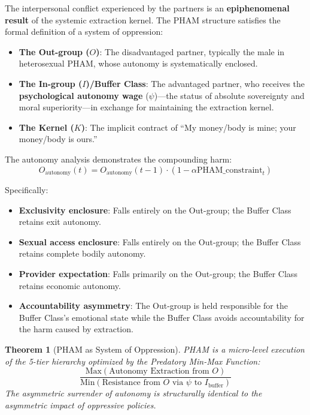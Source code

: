 \documentclass[12pt,openany]{book}
\newtheorem{theorem}{Theorem}[chapter]
\numberwithin{equation}{chapter}
\begin{document}
The interpersonal conflict experienced by the partners is an \textbf{epiphenomenal result} of the systemic extraction kernel. The PHAM structure satisfies the formal definition of a system of oppression:

\begin{itemize}
    \item \textbf{The Out-group ($O$)}: The disadvantaged partner, typically the male in heterosexual PHAM, whose autonomy is systematically enclosed.
    \item \textbf{The In-group ($I$)/Buffer Class}: The advantaged partner, who receives the \textbf{psychological autonomy wage} ($\psi$)---the status of absolute sovereignty and moral superiority---in exchange for maintaining the extraction kernel.
    \item \textbf{The Kernel ($K$)}: The implicit contract of ``My money/body is mine; your money/body is ours.''
\end{itemize}

The autonomy analysis demonstrates the compounding harm:
\[
O_{\text{autonomy}}(t) = O_{\text{autonomy}}(t-1) \cdot (1 - \alpha \text{PHAM\_constraint}_t)
\]

Specifically:
\begin{itemize}
    \item \textbf{Exclusivity enclosure}: Falls entirely on the Out-group; the Buffer Class retains exit autonomy.
    \item \textbf{Sexual access enclosure}: Falls entirely on the Out-group; the Buffer Class retains complete bodily autonomy.
    \item \textbf{Provider expectation}: Falls primarily on the Out-group; the Buffer Class retains economic autonomy.
    \item \textbf{Accountability asymmetry}: The Out-group is held responsible for the Buffer Class's emotional state while the Buffer Class avoids accountability for the harm caused by extraction.
\end{itemize}

\begin{theorem}[PHAM as System of Oppression]
PHAM is a micro-level execution of the 5-tier hierarchy optimized by the Predatory Min-Max Function:
\[
\frac{\text{Max}(\text{Autonomy Extraction from } O)}{\text{Min}(\text{Resistance from } O \text{ via } \psi \text{ to } I_{\text{buffer}})}
\]
The asymmetric surrender of autonomy is structurally identical to the asymmetric impact of oppressive policies.
\end{theorem}
\end{document}
